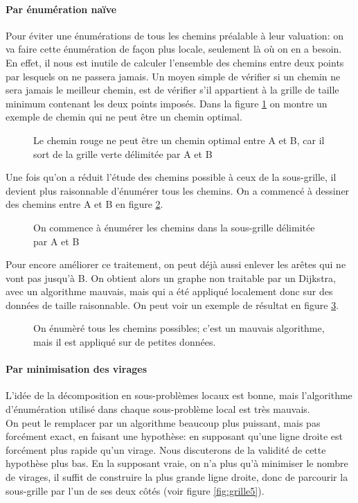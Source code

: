 \paragraph{Par énumération naïve}Pour éviter une énumérations de tous les chemins préalable à leur valuation: on va faire cette énumération de façon plus locale, seulement là où on en a besoin. En effet, il nous est inutile de calculer l'ensemble des chemins entre deux points par lesquels on ne passera jamais. Un moyen simple de vérifier si un chemin ne sera jamais le meilleur chemin, est de vérifier s'il appartient à la grille de taille minimum contenant les deux points imposés. Dans la figure \ref{fig:grille2} on montre un exemple de chemin qui ne peut être un chemin optimal.\\
\begin{figure}[h]
	\centering
	
	\caption{Le chemin rouge ne peut être un chemin optimal entre A et B, car il sort de la grille verte délimitée par A et B}
	\label{fig:grille2}
\end{figure}
Une fois qu'on a réduit l'étude des chemins possible à ceux de la sous-grille, il devient plus raisonnable d'énumérer tous les chemins. On a commencé à dessiner des chemins entre A et B en figure \ref{fig:grille3}.\\
\begin{figure}[h]
	\centering
	
	\caption{On commence à énumérer les chemins dans la sous-grille délimitée par A et B}
	\label{fig:grille3}
\end{figure}

Pour encore améliorer ce traitement, on peut déjà aussi enlever les arêtes qui ne vont pas jusqu'à B. On obtient alors un graphe non traitable par un Dijkstra, avec un algorithme mauvais, mais qui a été appliqué localement donc sur des données de taille raisonnable. On peut voir un exemple de résultat en figure \ref{fig:grille4}.\\
\begin{figure}
	\centering
	
	\caption{On énumèré tous les chemins possibles; c'est un mauvais algorithme, mais il est appliqué sur de petites données.}
	\label{fig:grille4}
\end{figure}
\paragraph{Par minimisation des virages}
L'idée de la décomposition en sous-problèmes locaux est bonne, mais l'algorithme d'énumération utilisé dans chaque sous-problème local est très mauvais.\\
On peut le remplacer par un algorithme beaucoup plus puissant, mais pas forcément exact, en faisant une hypothèse: en supposant qu'une ligne droite est forcément plus rapide qu'un virage. Nous discuterons de la validité de cette hypothèse plus bas. En la supposant vraie, on n'a plus qu'à minimiser le nombre de virages, il suffit de construire la plus grande ligne droite, donc de parcourir la sous-grille par l'un de ses deux côtés (voir figure \ref{fig:grille5}).
